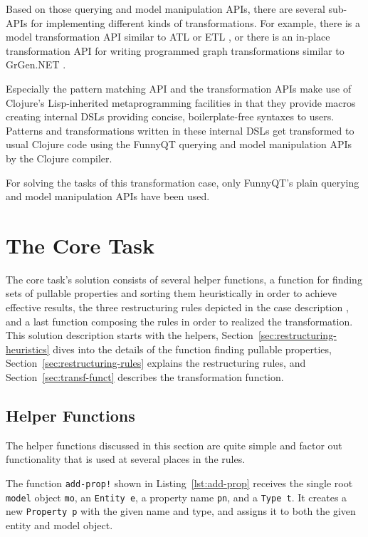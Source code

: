 \documentclass[11pt]{article}
\begin{document}
Based on those querying and model manipulation APIs, there are several sub-APIs
for implementing different kinds of transformations.  For example, there is a
model transformation API similar to ATL \cite{ATL05} or ETL
\cite{booklet:epsilon}, or there is an in-place transformation API for writing
programmed graph transformations similar to GrGen.NET
\cite{manual:GrGenManual}.

Especially the pattern matching API and the transformation APIs make use of
Clojure's Lisp-inherited metaprogramming facilities
\cite{Graham1993OnLisp,Hoyte08LoL} in that they provide macros creating
internal DSLs \cite{book:Fowler2010DSL} providing concise, boilerplate-free
syntaxes to users.  Patterns and transformations written in these internal DSLs
get transformed to usual Clojure code using the FunnyQT querying and model
manipulation APIs by the Clojure compiler.

For solving the tasks of this transformation case, only FunnyQT's plain
querying and model manipulation APIs have been used.


\section{The Core Task}
\label{sec:core-task}

The core task's solution consists of several helper functions, a function for
finding sets of pullable properties and sorting them heuristically in order to
achieve effective results, the three restructuring rules depicted in the case
description \cite{cdrestructcasedesc}, and a last function composing the rules
in order to realized the transformation.  This solution description starts with
the helpers, Section~\ref{sec:restructuring-heuristics} dives into the details
of the function finding pullable properties,
Section~\ref{sec:restructuring-rules} explains the restructuring rules, and
Section~\ref{sec:transf-funct} describes the transformation function.

\subsection{Helper Functions}
\label{sec:helper-functions}

The helper functions discussed in this section are quite simple and factor out
functionality that is used at several places in the rules.

The function \verb|add-prop!| shown in Listing~\ref{lst:add-prop} receives the
single root \verb|model| object \verb|mo|, an \verb|Entity e|, a property name
\verb|pn|, and a \verb|Type t|.  It creates a new \verb|Property p| with the
given name and type, and assigns it to both the given entity and model object.
\end{document}
